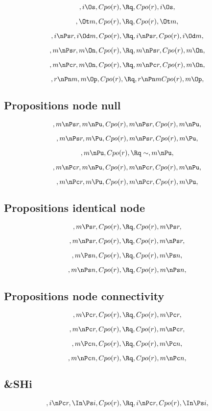 \[, i \Os, Cpo(r), \Rq , Cpo(r), i \Os, \]

\[, \Ot m, Cpo(r), \Rq , Cpo(r), \Ot m, \]

\[, i \nPs r, i \Od m, Cpo(r), \Rq , i \nPs r, Cpo(r), i \Od m, \]

\[, m \nPs r, m \On, Cpo(r), \Rq , m \nPs r, Cpo(r), m \On, \]

\[, m \nPc r, m \On, Cpo(r), \Rq , m \nPc r, Cpo(r), m \On, \]

\[, r \nPn m, m \Op, Cpo(r), \Rq , r \nPn m Cpo(r), m \Op, \]


\bigskip
\bigskip
\subsection{Propositions node null}
\[, m \nPs r, m \nPu, Cpo(r), m \nPs r, Cpo(r), m \nPu, \]

\[, m \nPs r, m \Pu, Cpo(r), m \nPs r, Cpo(r), m \Pu, \]

\[, m \nPu, Cpo(r), \Rq \sim, m \nPu, \]

\[, m \nPc r, m \nPu, Cpo(r), m \nPc r, Cpo(r), m \nPu, \]

\[, m \nPc r, m \Pu, Cpo(r), m \nPc r, Cpo(r), m \Pu, \]


\bigskip
\bigskip
\subsection{Propositions identical node}
\[, m \Ps r, Cpo(r), \Rq , Cpo(r), m \Ps r, \]

\[, m \nPs r, Cpo(r), \Rq , Cpo(r), m \nPs r, \]



\[, m \Ps n, Cpo(r), \Rq , Cpo(r), m \Ps n, \]

\[, m \nPs n, Cpo(r), \Rq , Cpo(r), m \nPs n, \]


\bigskip
\bigskip
\subsection{Propositions  node connectivity}


\[, m \Pc r, Cpo(r), \Rq , Cpo(r), m \Pc r, \]

\[, m \nPc r, Cpo(r), \Rq , Cpo(r), m \nPc r, \]


\[, m \Pc n, Cpo(r), \Rq , Cpo(r), m \Pc n, \]

\[, m \nPc n, Cpo(r), \Rq , Cpo(r), m \nPc n, \]


\bigskip
\bigskip
\subsection{\&SHi}
\[, i \nPc r, \In \Ps i, Cpo(r), \Rq , i \nPc r, Cpo(r), \In \Ps i, \]


